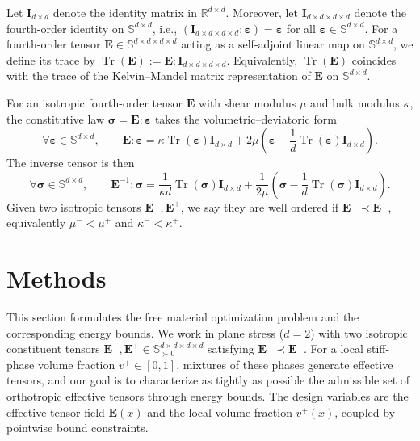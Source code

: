 \documentclass[preprint,3p]{elsarticle}
\newcommand{\tens}[1]{\bm{\mathit{#1}}}             %
\newcommand{\tenss}[1]{\bm{\mathbf{#1}}}            %
\newcommand{\tensf}[1]{\bm{\mathbf{#1}}}            %
\newcommand{\strain}{\tenss{\varepsilon}}           %
\newcommand{\stress}{\tenss{\sigma}}                %
\newcommand{\Emin}{\tensf{E}^{-}}                   %
\newcommand{\Emax}{\tensf{E}^{+}}                   %
\newcommand{\Tr}{\operatorname{Tr}}
\begin{document}
Let $\tenss{I}_{d\times d}$ denote the identity matrix in $\mathbb{R}^{d\times d}$. Moreover, let $\tensf{I}_{d\times d\times d\times d}$ denote the fourth-order identity on $\mathbb{S}^{d\times d}$, i.e., $(\tensf{I}_{d\times d\times d\times d}:\tenss{\varepsilon})=\tenss{\varepsilon}$ for all $\tenss{\varepsilon}\in\mathbb{S}^{d\times d}$. For a fourth-order tensor $\tensf{E}\in\mathbb{S}^{d\times d\times d\times d}$ acting as a self-adjoint linear map on $\mathbb{S}^{d\times d}$, we define its trace by $\Tr(\tensf{E}) := \tensf{E}:\tensf{I}_{d\times d\times d\times d}$. Equivalently, $\Tr(\tensf{E})$ coincides with the trace of the Kelvin--Mandel matrix representation of $\tensf{E}$ on $\mathbb{S}^{d\times d}$.

For an isotropic fourth-order tensor $\tensf{E}$ with shear modulus $\mu$ and bulk modulus $\kappa$, the constitutive law $\stress=\tensf{E}:\strain$ takes the volumetric--deviatoric form
%
\begin{equation}
    \forall\strain\in\mathbb{S}^{d\times d}, \qquad
    \tensf{E}:\strain=\kappa \Tr(\strain)\tenss{I}_{d\times d}+2\mu \left(\strain-\frac{1}{d}\Tr(\strain)\tenss{I}_{d\times d}\right).
\end{equation}
The inverse tensor is then
%
\begin{equation}
    \forall\stress\in\mathbb{S}^{d\times d},\qquad {\tensf{E}}^{-1}:\stress=\frac{1}{\kappa d} \Tr(\stress)\tenss{I}_{d\times d}+\frac{1}{2\mu} \left(\stress-\frac{1}{d}\Tr(\stress)\tenss{I}_{d\times d}\right).
\end{equation}
Given two isotropic tensors $\Emin,\Emax$, we say they are well ordered if $\Emin\prec \Emax$, equivalently $\mu^-<\mu^+$ and $\kappa^-<\kappa^+$.

\section{Methods}

This section formulates the free material optimization problem and the corresponding energy bounds. We work in plane stress ($d=2$) with two isotropic constituent tensors $\Emin,\Emax \in \mathbb{S}^{d\times d\times d\times d}_{\succ 0}$ satisfying $\Emin \prec \Emax$. For a local stiff-phase volume fraction $v^+\in[0,1]$, mixtures of these phases generate effective tensors, and our goal is to characterize as tightly as possible the admissible set of orthotropic effective tensors through energy bounds. The design variables are the effective tensor field $\tensf{E}(\tens{x})$ and the local volume fraction $v^+(\tens{x})$, coupled by pointwise bound constraints.
\end{document}
